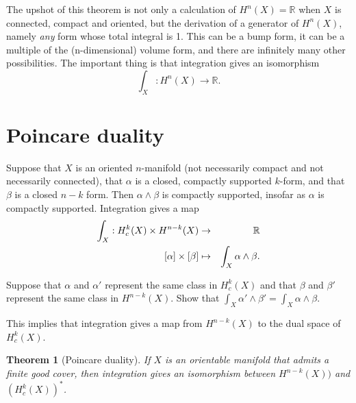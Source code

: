 \documentclass[12pt]{amsbook}
\newcommand{\R}{{\mathbb R}}
\newtheorem{thm}{Theorem}[section]
\theoremstyle{definition}
\begin{document}
The upshot of this theorem is not only a calculation of $H^n(X)=\R$
when $X$ is connected, compact and oriented, but the derivation of a
generator of $H^n(X)$, namely {\em any} form whose total integral is
1. This can be a bump form, it can be a multiple of the
(n-dimensional) volume form, and there are infinitely many other
possibilities. The important thing is that integration gives an
isomorphism
$$ \int_X: H^n(X) \to \R.$$

\section{Poincare duality}

Suppose that $X$ is an oriented $n$-manifold (not
necessarily compact and not necessarily connected), 
that $\alpha$ is a closed, compactly supported
$k$-form, and that $\beta$ is a closed $n-k$ form.  Then $\alpha
\wedge \beta$ is compactly supported, insofar as $\alpha$ is compactly
supported.  Integration gives a map
\begin{eqnarray} \int_X: H^k_c(X) \times H^{n-k}(X) & \to & \R \cr 
[\alpha]\times[\beta] & \mapsto & \int_X \alpha \wedge \beta.
\end{eqnarray}

\smallskip

 Suppose that $\alpha$ and $\alpha'$ represent
the same class in $H^k_c(X)$ and that $\beta$ and $\beta'$ represent
the same class in $H^{n-k}(X)$. Show that $\int_X \alpha' \wedge
\beta' = \int_X \alpha \wedge \beta$.

\smallskip

This implies that integration gives a map from $H^{n-k}(X)$ to the
dual space of $H^k_c(X)$.

\begin{thm}[Poincare duality] If $X$ is an orientable manifold that
  admits a finite good cover, then integration gives an isomorphism
  between $H^{n-k}(X))$ and $(H^k_c(X))^*$.
\end{thm}
\end{document}
